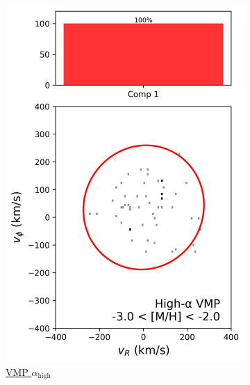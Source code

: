 \documentclass[a4paper,10pt]{article}
\begin{document}
\begin{multicols}{2}
\begin{figure}[H]
  \centering
  \begin{subfigure}[t]{0.24\linewidth}
    \includegraphics[width=\linewidth]{../figures/gmm_vmp_high_alpha_k1.png}
    \caption{\href{https://raw.githack.com/raunaq-rai/Disentangling-the-Milky-Way-using-GMM/main/figures/VMP\_high\_\_\_-3\%5BM\_H\%5D-2.html}{VMP $\alpha_{\mathrm{high}}$}}
    \label{fig:vmp_hi}
  \end{subfigure}\hfill
  \begin{subfigure}[t]{0.24\linewidth}

\end{subfigure}
\end{figure}
\end{multicols}
\end{document}
